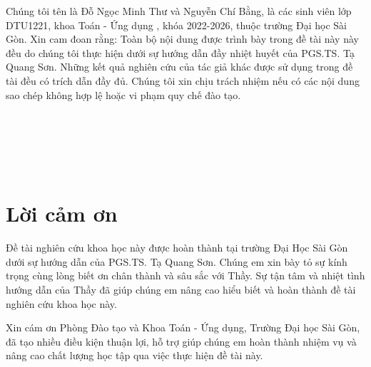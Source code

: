 \documentclass[12pt,a4paper]{report}
\begin{document}
	Chúng tôi tên là Đỗ Ngọc Minh Thư và Nguyễn Chí Bằng, là các  sinh viên lớp DTU1221, khoa Toán - Ứng dụng , khóa 2022-2026,  thuộc trường Đại học Sài Gòn. 
	Xin cam đoan rằng: Toàn bộ nội dung được trình bày trong đề tài  này này đều do chúng tôi thực hiện dưới sự hướng dẫn đầy nhiệt huyết của PGS.TS. Tạ Quang Sơn.
	Những kết quả nghiên cứu của tác giả khác được sử dụng trong đề tài  đều có trích dẫn đầy đủ. 
	Chúng tôi xin chịu trách nhiệm nếu có các nội dung sao chép không hợp lệ hoặc vi phạm quy chế đào tạo. 
	\\
	\\
	\\
	\\
	\\
	\\
	
	
	\chapter*{Lời cảm ơn}
	\thispagestyle{fancy}
	\vspace{1cm}
	\indent
	
	Đề tài nghiên cứu khoa học này được hoàn thành tại trường Đại Học Sài Gòn dưới sự hướng dẫn của PGS.TS. Tạ Quang Sơn. Chúng em xin bày tỏ sự kính trọng cùng lòng biết ơn chân thành và sâu sắc với Thầy. Sự tận tâm và nhiệt tình hướng dẫn của Thầy đã giúp chúng em nâng cao hiểu biết và hoàn thành đề tài nghiên cứu khoa học này.
	
	
	\bigskip
	Xin cám ơn Phòng Đào tạo  và Khoa Toán - Ứng dụng, Trường Đại học Sài Gòn, đã tạo nhiều điều kiện thuận lợi, hỗ trợ giúp chúng em hoàn thành nhiệm vụ và nâng cao chất lượng học tập qua việc thực hiện đề tài này.
	\\
	\\
	\\
	\\
	\\
	
\end{document}
